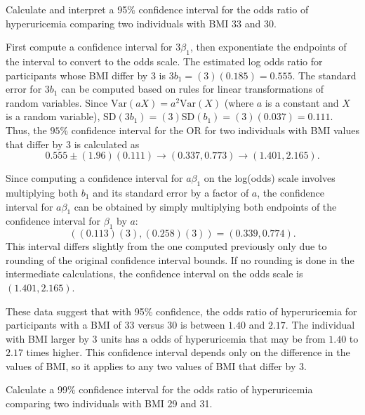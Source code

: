 \begin{examplewrap}
\begin{nexample}{Calculate and interpret a 95\% confidence interval for the odds ratio of hyperuricemia comparing two individuals with BMI 33 and 30.}
\label{example:confidenceIntervalHyperuricemiaBmi}

First compute a confidence interval for $3\beta_1$, then exponentiate the endpoints of the interval to convert to the odds scale. The estimated log odds ratio for participants whose BMI differ by 3 is $3b_1 = (3)(0.185) = 0.555$. The standard error for $3b_1$ can be computed based on rules for linear transformations of random variables. Since $\text{Var}(aX) = a^2 \text{Var}(X)$ (where $a$ is a constant and $X$ is a random variable), $\text{SD}(3b_1) = (3)\text{SD}(b_1) = (3)(0.037) = 0.111$. Thus, the $95\%$ confidence interval for the OR for two individuals with BMI values that differ by 3 is calculated as
  \[0.555 \pm (1.96)(0.111) \longrightarrow (0.337, 0.773) \longrightarrow (1.401, 2.165).  \]

Since computing a confidence interval for $a\beta_1$ on the log(odds) scale involves multiplying both $b_1$ and its standard error by a factor of $a$, the confidence interval for $a\beta_1$ can be obtained by simply multiplying both endpoints of the confidence interval for $\beta_1$ by $a$:
  \[((0.113)(3), (0.258)(3)) = (0.339, 0.774). \]
This interval differs slightly from the one computed previously only due to rounding of the original confidence interval bounds. If no rounding is done in the intermediate calculations, the confidence interval on the odds scale is $(1.401, 2.165)$.

These data suggest that with 95\% confidence, the odds ratio of hyperuricemia for participants with a BMI of 33 versus 30 is between $1.40$ and $2.17$. The individual with BMI larger by 3 units has a odds of hyperuricemia that may be from $1.40$ to $2.17$ times higher. This confidence interval depends only on the difference in the values of BMI, so it applies to any two values of BMI that differ by 3.
\end{nexample}
\end{examplewrap}


\begin{exercisewrap}
  \begin{nexercise}
    Calculate a 99\% confidence interval for the odds ratio of hyperuricemia comparing two individuals with BMI 29 and 31.      \footnotemark{}
  \end{nexercise}
\end{exercisewrap}

